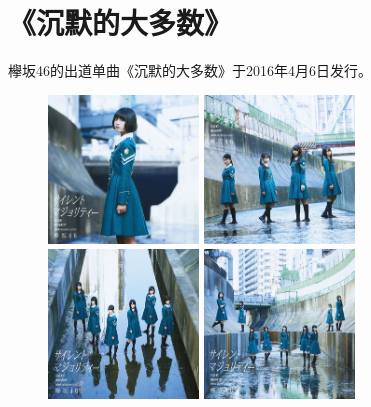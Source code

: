 ﻿
\chapter{《沉默的大多数》}

欅坂46的出道单曲《沉默的大多数》于2016年4月6日发行。
\\

\begin{figure}[htp]
  \centering
  {\includegraphics[width=40mm]{images/single-1/1-1.jpg}}
  {\includegraphics[width=40mm]{images/single-1/1-2.jpg}}
  \\
  {\includegraphics[width=40mm]{images/single-1/1-3.jpg}}
  {\includegraphics[width=40mm]{images/single-1/1-4.jpg}}
\end{figure}

\thispagestyle{empty} %
\clearpage





       \clearpage
             \clearpage
                         \clearpage
                         \clearpage
                 \clearpage
                   \clearpage

